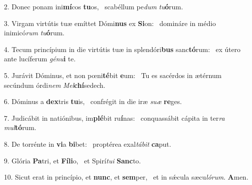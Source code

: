 2. Donec ponam ini\textbf{mí}cos \textbf{tu}os, \ast\  scabéllum pe\textit{dum} \textit{tu}\textbf{ó}rum.\

3. Virgam virtútis tuæ emíttet Dómi\textbf{nus} ex \textbf{Si}on: \ast\  domináre in médio inimicó\textit{rum} \textit{tu}\textbf{ó}rum.\

4. Tecum princípium in die virtútis tuæ in splendóri\textbf{bus} sanc\textbf{tó}rum: \ast\  ex útero ante lucíferum \textit{gé}\textit{nu}\textbf{i} te.\

5. Jurávit Dóminus, et non pœni\textbf{té}bit \textbf{e}um: \ast\  Tu es sacérdos in ætérnum secúndum órdi\textit{nem} \textit{Mel}\textbf{chí}sedech.\

6. Dóminus a \textbf{dex}tris \textbf{tu}is, \ast\  confrégit in die iræ \textit{su}\textit{æ} \textbf{re}ges.\

7. Judicábit in natiónibus, im\textbf{plé}bit ru\textbf{í}nas: \ast\  conquassábit cápita in ter\textit{ra} \textit{mul}\textbf{tó}rum.\

8. De torrénte in \textbf{vi}a \textbf{bi}bet: \ast\  proptérea exal\textit{tá}\textit{bit} \textbf{ca}put.\

9. Glória \textbf{Pa}tri, et \textbf{Fí}\textbf{li}o, \ast\  et Spirí\textit{tu}\textit{i} \textbf{Sanc}to.\

10. Sicut erat in princípio, et \textbf{nunc}, et \textbf{sem}per, \ast\  et in sǽcula sæcu\textit{ló}\textit{rum}. \textbf{A}men.\


